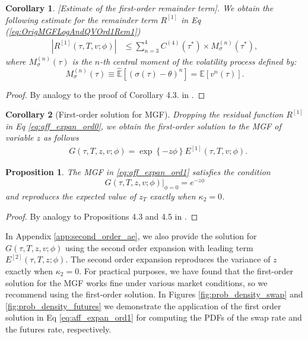 \documentclass[pdftex,11pt,a4paper] {article}
\newtheorem{corollary}{Corollary}[section]
\newtheorem{proposition}{Proposition}[section]
\begin{document}
\begin{corollary} \label {pr:ar1} [Estimate of the first-order remainder term]. We obtain the following estimate for the remainder term $R^{[1]}$ in Eq (\ref{eq:OrigMGFLogAndQVOrd1Rem1})
\begin{equation} \label {eq:rem1}
\begin{split}
\left| R^{[1]}(\tau,T,v;\phi) \right|  & \leq  \sum^{4}_{n=3}C^{(4)}(\tau^{*})\times M^{(n)}_{\sigma}(\tau^{*}),
\end{split}
\end{equation}
where $M^{(n)}_{\sigma}(\tau)$ is the $n$-th central moment of the volatility process defined by:
\begin{equation}\label{eq:central_mom_vol}
M^{(n)}_{\sigma}(\tau) \equiv \hat{\mathbb{E}}\left[(\sigma(\tau)-\theta)^n\right] = \mathbb{E}\left[v^n(\tau)\right].
\end{equation}
\end{corollary}

\begin{proof}
By analogy to the proof of Corollary 4.3. in \cite{Sepp2024}.
\end{proof}



\begin{corollary}[First-order solution for MGF]
Dropping the residual function $R^{[1]}$ in Eq \eqref{eq:aff_expan_ord0}, we obtain the first-order solution to the MGF of variable $z$ as follows
\begin{equation}\label{eq:aff_expan_ord1}
\begin{split}
& G(\tau,T,z,v;\phi)= \exp\left\{ -z\phi \right\}   E^{[1]}(\tau,T,v;\phi).
\end{split}
\end{equation}
\end{corollary}


\begin{proposition} The MGF in \eqref{eq:aff_expan_ord1} satisfies the condition 
\begin{equation*}
\left.G(\tau,T,z,v;\phi)\right|_{\phi=0}=e^{-z\phi}
\end{equation*}
and reproduces the expected value of $z_{T}$ exactly when $\kappa_2=0$.
\end{proposition}

\begin{proof}
By analogy to Propositions 4.3 and 4.5 in \cite{Sepp2024}.
\end{proof}

In Appendix \ref{app:second_order_ae}, we also provide the solution for $G(\tau,T,z,v;\phi)$ using the second order expansion with leading term $E^{[2]}(\tau,T,z;\phi)$. The second order expansion reproduces the variance of $z$ exactly when $\kappa_2=0$. For practical purposes, we have found that the first-order solution for the MGF works fine under various market conditions, so we recommend using the first-order solution. In Figures \ref{fig:prob_density_swap} and \ref{fig:prob_density_futures} we demonstrate the application of the first order solution in Eq \eqref{eq:aff_expan_ord1} for computing the PDFs of the swap rate and the futures rate, respectively.
\end{document}
